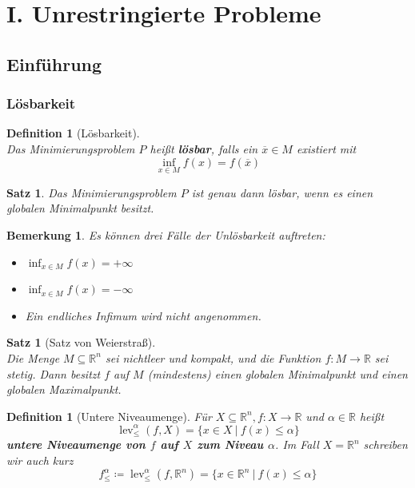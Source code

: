 \documentclass[11pt]{scrreprt}
\newcounter{thm}
\theoremstyle{thmstyle}
\numberwithin{thm}{section}
\newtheorem{definition}[thm]{Definition}
\newtheorem{satz}[thm]{Satz}
\newtheorem*{bemerkung*}{Bemerkung}
\begin{document}
\chapter*{I. Unrestringierte Probleme}
\setcounter{chapter}{1}
\setcounter{section}{1}

\section*{Einführung}

\subsection*{Lösbarkeit}

\setcounter{section}{2}
\setcounter{thm}{2}

\begin{definition}[Lösbarkeit] ~\\
	Das Minimierungsproblem $P$ heißt \textbf{lösbar}, falls ein $\overline{x} \in M$ existiert mit
	$$ \inf_{x \in M} f(x) = f(\overline{x}) $$
\end{definition}

\setcounter{thm}{4}

\begin{satz}
	Das Minimierungsproblem $P$ ist genau dann lösbar, wenn es einen globalen Minimalpunkt besitzt.
\end{satz}

\begin{bemerkung*}
	Es können drei Fälle der Unlösbarkeit auftreten:

	\begin{itemize}
		\item $\inf_{x \in M} f(x) = + \infty$
		\item $\inf_{x \in M} f(x) = - \infty$
		\item Ein endliches Infimum wird nicht angenommen.
	\end{itemize}	
\end{bemerkung*}


\begin{satz}[Satz von Weierstraß] ~\\
	Die Menge $M \subseteq \mathbb{R}^n$ sei nichtleer und kompakt, und die Funktion $f \colon M \rightarrow \mathbb{R}$ sei stetig. Dann besitzt $f$ auf $M$ (mindestens) einen globalen Minimalpunkt und einen globalen Maximalpunkt.
\end{satz}

\setcounter{thm}{7}

\begin{definition}[Untere Niveaumenge]
	Für $X \subseteq \mathbb{R}^n, f \colon X \rightarrow \mathbb{R}$ und $\alpha \in \mathbb{R}$ heißt
	$$ \operatorname{lev}_{\leq}^{\alpha}(f, X) = \big\{ x \in X ~|~ f(x) \leq \alpha \big\} $$
	\textbf{untere Niveaumenge von $f$ auf $X$ zum Niveau $\alpha$}. Im Fall $X = \mathbb{R}^n$ schreiben wir auch kurz
	$$ f_{\leq}^{\alpha} \coloneqq \operatorname{lev}_{\leq}^{\alpha}(f, \mathbb{R}^n) = \big\{ x \in \mathbb{R}^n ~|~ f(x) \leq \alpha \big\} $$
\end{definition}
\end{document}
